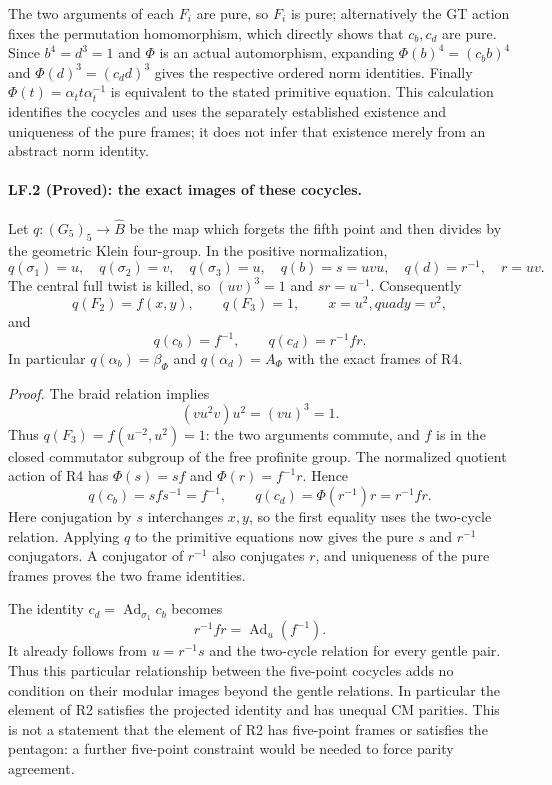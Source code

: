 The two arguments of each $F_i$ are pure, so $F_i$ is pure; alternatively
the GT action fixes the permutation homomorphism, which directly shows
that $c_b,c_d$ are pure. Since $b^4=d^3=1$ and $\Phi$ is an actual
automorphism, expanding $\Phi(b)^4=(c_bb)^4$ and
$\Phi(d)^3=(c_dd)^3$ gives the respective ordered norm identities.
Finally $\Phi(t)=\alpha_t t\alpha_t^{-1}$ is equivalent to the stated
primitive equation. This calculation identifies the cocycles and uses
the separately established existence and uniqueness of the pure frames;
it does not infer that existence merely from an abstract norm identity.

\paragraph{LF.2 (Proved): the exact images of these cocycles.}
Let $q:(G_5)_5\to\widehat B$ be the map which forgets the fifth point
and then divides by the geometric Klein four-group. In the positive
normalization,
\[
 q(\sigma_1)=u,\quad q(\sigma_2)=v,\quad q(\sigma_3)=u,
 \quad q(b)=s=uvu,\quad q(d)=r^{-1},\quad r=uv.
\]
The central full twist is killed, so $(uv)^3=1$ and $sr=u^{-1}$.
Consequently
\[
 q(F_2)=f(x,y),\qquad q(F_3)=1,
 \qquad x=u^2,quad y=v^2,
\]
and
\[
 \boxed{q(c_b)=f^{-1},\qquad q(c_d)=r^{-1}fr.}
\]
In particular $q(\alpha_b)=\beta_\Phi$ and
$q(\alpha_d)=A_\Phi$ with the exact frames of R4.

\emph{Proof.}
The braid relation implies
\[
 (vu^2v)u^2=(vu)^3=1.
\]
Thus $q(F_3)=f(u^{-2},u^2)=1$: the two arguments commute, and
$f$ is in the closed commutator subgroup of the free profinite group.
The normalized quotient action of R4 has
$\Phi(s)=sf$ and $\Phi(r)=f^{-1}r$. Hence
\[
 q(c_b)=sf s^{-1}=f^{-1},\qquad
 q(c_d)=\Phi(r^{-1})r=r^{-1}fr.
\]
Here conjugation by $s$ interchanges $x,y$, so the first equality uses
the two-cycle relation. Applying $q$ to the primitive equations now
gives the pure $s$ and $r^{-1}$ conjugators. A conjugator of $r^{-1}$
also conjugates $r$, and uniqueness of the pure frames proves the two
frame identities.

The identity $c_d=\operatorname{Ad}_{\sigma_1}c_b$ becomes
\[
 r^{-1}fr=\operatorname{Ad}_{u}(f^{-1}).
\]
It already follows from $u=r^{-1}s$ and the two-cycle relation for every
gentle pair. Thus this particular relationship between the five-point
cocycles adds no condition on their modular images beyond the gentle
relations. In particular the element of R2 satisfies the projected
identity and has unequal CM parities. This is not a statement that the
element of R2 has five-point frames or satisfies the pentagon: a further
five-point constraint would be needed to force parity agreement.
